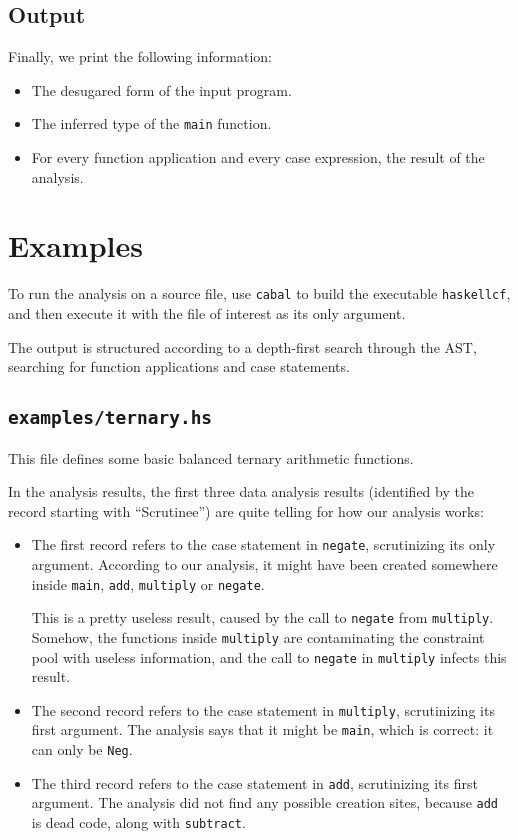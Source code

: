 \documentclass[a4paper]{scrartcl}
\begin{document}
\subsection{Output}
Finally, we print the following information:
\begin{itemize}
\item The desugared form of the input program.
\item The inferred type of the \texttt{main} function.
\item For every function application and every case expression, the result of
    the analysis.
\end{itemize}

\section{Examples}

To run the analysis on a source file, use \texttt{cabal} to build
the executable \texttt{haskellcf}, and then execute it with the file of
interest as its only argument.

The output is structured according to a depth-first search through the AST,
searching for function applications and case statements.

\subsection{\texttt{examples/ternary.hs}}

This file defines some basic balanced ternary arithmetic functions.

In the analysis results, the first three data analysis results (identified
by the record starting with ``Scrutinee'') are quite telling for how our
analysis works:
\begin{itemize}
\item
    The first record refers to the case statement in \texttt{negate},
    scrutinizing its only argument. According to our analysis, it might have
    been created somewhere inside \texttt{main}, \texttt{add}, \texttt{multiply}
    or \texttt{negate}.

    This is a pretty useless result, caused by the call to \texttt{negate}
    from \texttt{multiply}. Somehow, the functions inside \texttt{multiply}
    are contaminating the constraint pool with useless information, and the
    call to \texttt{negate} in \texttt{multiply} infects this result.
\item
    The second record refers to the case statement in \texttt{multiply},
    scrutinizing its first argument. The analysis says that it might
    be \texttt{main}, which is correct: it can only be \texttt{Neg}.
\item
    The third record refers to the case statement in \texttt{add},
    scrutinizing its first argument. The analysis did not find any
    possible creation sites, because \texttt{add} is dead code, along with
    \texttt{subtract}.
\end{itemize}
\end{document}
